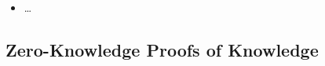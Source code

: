 \begin{frame}
  \begin{example}
    \begin{itemize}
      \item \dots
    \end{itemize}
  \end{example}
\end{frame}

\subsection{Zero-Knowledge Proofs of Knowledge}

\begin{frame}
\end{frame}




\begin{frame}[allowframebreaks]
  \printbibliography{}
\end{frame}

